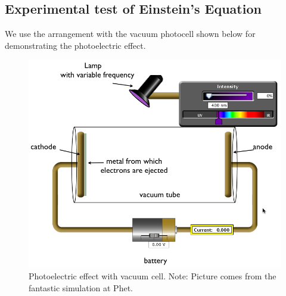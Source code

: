\subsection{Experimental test of Einstein's Equation}

We use the arrangement with the vacuum photocell shown below  for demonstrating the photoelectric effect.

\begin{figure}
\includegraphics[]{vaccell.png}
\caption{Photoelectric effect with vacuum cell. Note: Picture comes from the fantastic simulation at Phet.}
\end{figure}

